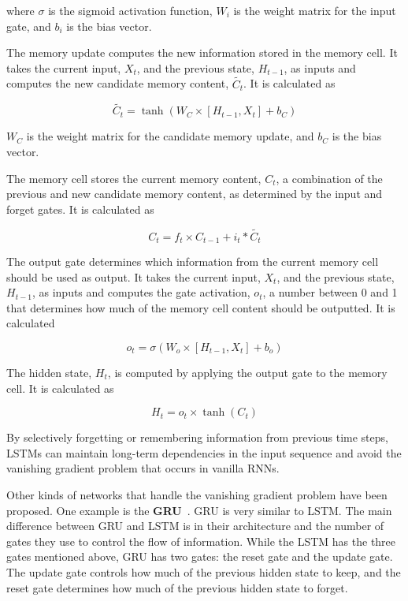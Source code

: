 where $\sigma$ is the sigmoid activation function, $W_i$ is the weight matrix for the input gate, and $b_i$ is the bias vector.

The memory update computes the new information stored in the memory cell. It takes the current input, $X_t$, and the previous state, $H_{t-1}$, as inputs and computes the new candidate memory content, $\tilde{C_t}$. It is calculated as

\begin{equation}
    \tilde{C_t} = \tanh (W_C \times [H_{t-1}, X_t] + b_C)
\end{equation}

$W_C$ is the weight matrix for the candidate memory update, and $b_C$ is the bias vector.

The memory cell stores the current memory content, $C_t$, a combination of the previous and new candidate memory content, as determined by the input and forget gates. It is calculated as

\begin{equation}
    C_t = f_t \times C_{t-1} + i_t * \tilde{C_t}
\end{equation}

The output gate determines which information from the current memory cell should be used as output. It takes the current input, $X_t$, and the previous state, $H_{t-1}$, as inputs and computes the gate activation, $o_t$, a number between 0 and 1 that determines how much of the memory cell content should be outputted. It is calculated

\begin{equation}
    o_t = \sigma (W_o \times [H_{t-1}, X_t] + b_o)
\end{equation}

The hidden state, $H_t$, is computed by applying the output gate to the memory cell. It is calculated as

\begin{equation}
    H_t = o_t \times \tanh (C_t)
\end{equation}

By selectively forgetting or remembering information from previous time steps, \acp{LSTM} can maintain long-term dependencies in the input sequence and avoid the vanishing gradient problem that occurs in vanilla \acp{RNN}.

Other kinds of networks that handle the vanishing gradient problem have been proposed. One example is the \textbf{\acf{GRU}}~\cite{cho_learning_2014}. \Ac{GRU} is very similar to \ac{LSTM}. The main difference between \ac{GRU} and \ac{LSTM} is in their architecture and the number of gates they use to control the flow of information. While the \ac{LSTM} has the three gates mentioned above, \ac{GRU} has two gates: the reset gate and the update gate. The update gate controls how much of the previous hidden state to keep, and the reset gate determines how much of the previous hidden state to forget.

